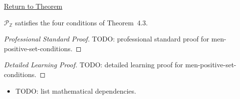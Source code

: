 \newpage
{}
\label{prf:men-positive-set-conditions}

\begin{remark*}[Return]
\hyperref[lem:men-positive-set-conditions]{Return to Theorem}
\end{remark*}

\begin{lemma*}[Mendelson 4.5]
$\mathcal{P}_\mathbb{Z}$ satisfies the four conditions of Theorem~4.3.
\end{lemma*}

\begin{proof}[Professional Standard Proof]
\LRAProofBodyStart
TODO: professional standard proof for men-positive-set-conditions.
\end{proof}

\begin{proof}[Detailed Learning Proof]
\LRAProofBodyStart
TODO: detailed learning proof for men-positive-set-conditions.
\end{proof}

\begin{remark*}
\end{remark*}

\begin{dependencies}
\begin{itemize}
  \item TODO: list mathematical dependencies.
\end{itemize}
\end{dependencies}

\clearpage
